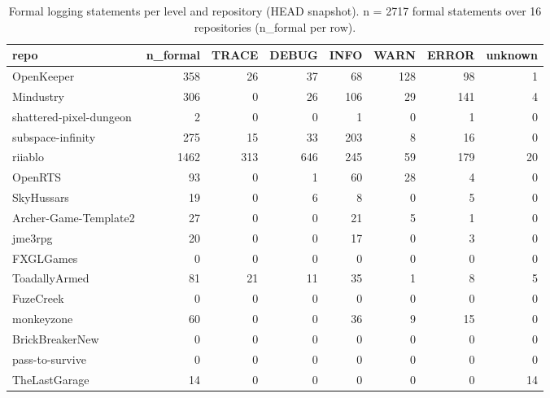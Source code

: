 \begin{table}[htbp]
\centering
\small
\caption{Formal logging statements per level and repository (HEAD snapshot). n = 2717 formal statements over 16 repositories (n\_formal per row).}
\label{tab:rq1_levels}
\begin{tabular}{lrrrrrrr}
\toprule
repo & n\_formal & TRACE & DEBUG & INFO & WARN & ERROR & unknown \\
\midrule
OpenKeeper & 358 & 26 & 37 & 68 & 128 & 98 & 1 \\
Mindustry & 306 & 0 & 26 & 106 & 29 & 141 & 4 \\
shattered-pixel-dungeon & 2 & 0 & 0 & 1 & 0 & 1 & 0 \\
subspace-infinity & 275 & 15 & 33 & 203 & 8 & 16 & 0 \\
riiablo & 1462 & 313 & 646 & 245 & 59 & 179 & 20 \\
OpenRTS & 93 & 0 & 1 & 60 & 28 & 4 & 0 \\
SkyHussars & 19 & 0 & 6 & 8 & 0 & 5 & 0 \\
Archer-Game-Template2 & 27 & 0 & 0 & 21 & 5 & 1 & 0 \\
jme3rpg & 20 & 0 & 0 & 17 & 0 & 3 & 0 \\
FXGLGames & 0 & 0 & 0 & 0 & 0 & 0 & 0 \\
ToadallyArmed & 81 & 21 & 11 & 35 & 1 & 8 & 5 \\
FuzeCreek & 0 & 0 & 0 & 0 & 0 & 0 & 0 \\
monkeyzone & 60 & 0 & 0 & 36 & 9 & 15 & 0 \\
BrickBreakerNew & 0 & 0 & 0 & 0 & 0 & 0 & 0 \\
pass-to-survive & 0 & 0 & 0 & 0 & 0 & 0 & 0 \\
TheLastGarage & 14 & 0 & 0 & 0 & 0 & 0 & 14 \\
\bottomrule
\end{tabular}
\end{table}
